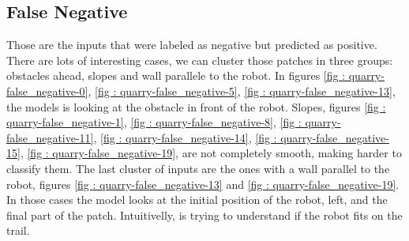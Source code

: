 \subsection{False Negative}
Those are the inputs that were labeled as negative but predicted as positive. There are lots of interesting cases, we can cluster those patches in three groups: obstacles ahead, slopes and wall parallele to the robot. In figures \ref{fig : quarry-false_negative-0}, \ref{fig : quarry-false_negative-5}, \ref{fig : quarry-false_negative-13}, the models is looking at the obstacle in front of the robot.  Slopes, figures \ref{fig : quarry-false_negative-1}, \ref{fig : quarry-false_negative-8}, \ref{fig : quarry-false_negative-11}, \ref{fig : quarry-false_negative-14}, \ref{fig : quarry-false_negative-15}, \ref{fig : quarry-false_negative-19}, are not completely smooth, making harder to classify them. The last cluster of inputs are the ones with a wall parallel to the robot, figures \ref{fig : quarry-false_negative-13} and \ref{fig : quarry-false_negative-19}. In those cases the model looks at the initial position of the robot, left, and the final part of the patch. Intuitivelly, is trying to understand if the robot fits on the trail. 


